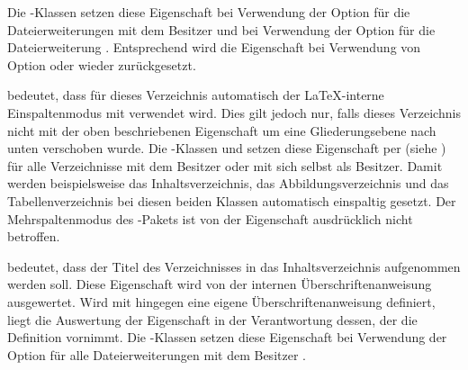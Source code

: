 \begin{description}
  Die \KOMAScript-Klassen setzen diese Eigenschaft bei Verwendung der Option
   für die Dateierweiterungen mit
  dem Besitzer  und bei Verwendung der Option
   für die Dateierweiterung
  . Entsprechend wird die Eigenschaft bei Verwendung von Option
   oder
   wieder zurückgesetzt.
\item[\PValue{onecolumn}] \leavevmode{}%
  bedeutet, dass für dieses Verzeichnis automatisch der \LaTeX-interne
  Einspaltenmodus mit  verwendet
  wird. Dies gilt jedoch nur, falls dieses Verzeichnis
  nicht mit der oben beschriebenen Eigenschaft
   um eine Gliederungsebene
  nach unten verschoben wurde. Die \KOMAScript-Klassen  und
   setzen diese Eigenschaft per
   (siehe
  ) für alle Verzeichnisse mit dem
  Besitzer  oder mit sich selbst als Besitzer. Damit werden
  beispielsweise das Inhaltsverzeichnis, das Abbildungsverzeichnis und das
  Tabellenverzeichnis bei diesen beiden Klassen automatisch einspaltig
  gesetzt. Der Mehrspaltenmodus des
  -Pakets ist von der Eigenschaft
  ausdrücklich nicht betroffen.
\item[\PValue{totoc}] bedeutet, dass der Titel des Verzeichnisses in das
  Inhaltsverzeichnis aufgenommen werden soll. Diese Eigenschaft wird von der
  internen Überschriftenanweisung ausgewertet. Wird mit
   hingegen eine eigene Überschriftenanweisung
  definiert, liegt die Auswertung der Eigenschaft in der Verantwortung dessen,
  der die Definition vornimmt. Die \KOMAScript-Klassen setzen diese
  Eigenschaft bei Verwendung der Option
   für alle Dateierweiterungen mit dem
  Besitzer .
\end{description}
